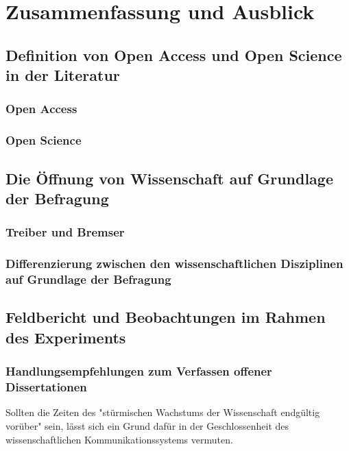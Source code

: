 \chapter{Zusammenfassung und Ausblick}

\section{Definition von Open Access und Open Science in der Literatur}
\subsection{Open Access}
\subsection{Open Science}
\section{Die Öffnung von Wissenschaft auf Grundlage der Befragung}
\subsection{Treiber und Bremser}
\subsection{Differenzierung zwischen den wissenschaftlichen Disziplinen auf Grundlage der Befragung}
\section{Feldbericht und Beobachtungen im Rahmen des Experiments}
\subsection{Handlungsempfehlungen zum Verfassen offener Dissertationen}


Sollten die Zeiten des "stürmischen Wachstums der Wissenschaft endgültig vorüber" \cite{K_lbel_2002} sein, lässt sich ein Grund dafür in der Geschlossenheit des wissenschaftlichen Kommunikationssystems vermuten.